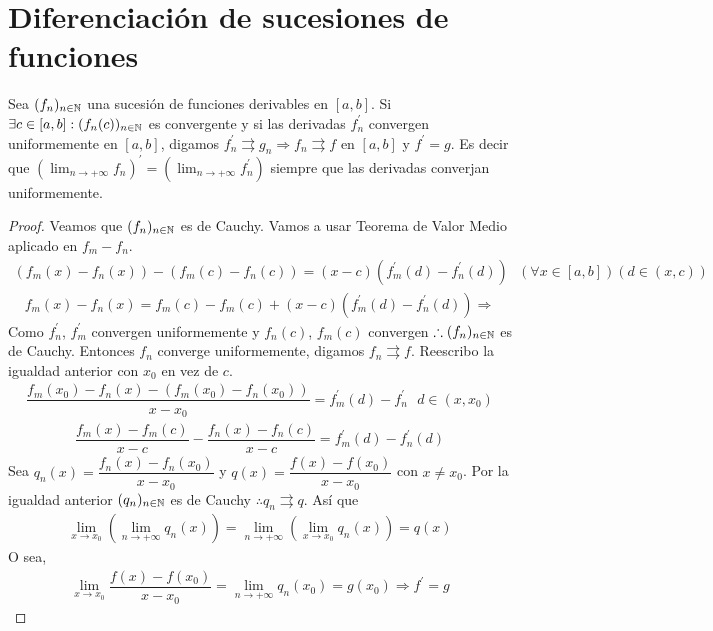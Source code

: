 \section{Diferenciación de sucesiones de funciones}

\begin{theorem}
  Sea $(f_n)_{n \in \mathbb{N}}$ una sucesión de funciones derivables en $[a, b]$. Si $\exists c \in [a, b] : (f_n(c))_{n \in \mathbb{N}}$ es convergente y si las derivadas $f_n^{\prime}$ convergen uniformemente en $[a, b]$, digamos $f_n^{\prime} \rightrightarrows g_n \Rightarrow f_n \rightrightarrows f$ en $[a, b]$ y $f^{\prime} = g$.
  Es decir que $(\lim_{n \to +\infty} f_n)^{\prime} = (\lim_{n \to +\infty} f_n^{\prime})$ siempre que las derivadas converjan uniformemente.
  \begin{proof}
    Veamos que $(f_n)_{n \in \mathbb{N}}$ es de Cauchy. Vamos a usar Teorema de Valor Medio aplicado en $f_m - f_n$. \begin{align*}
      (f_m(x) - f_n(x)) - (f_m(c) - f_n(c)) = (x-c)(f_m^{\prime}(d) - f_n^{\prime}(d)) \text{  } (\forall x \in [a, b])(d \in (x, c))
    \end{align*}
    \begin{align*}
      f_m(x) - f_n(x) = f_m(c) - f_m(c) + (x-c) (f_m^{\prime}(d) - f_n^{\prime}(d)) \Rightarrow
    \end{align*} Como $f_n^{\prime}$, $f_m^{\prime}$ convergen uniformemente y $f_n(c)$, $f_m(c)$ convergen $\therefore (f_n)_{n \in \mathbb{N}}$ es de Cauchy. Entonces $f_n$ converge uniformemente, digamos $f_n \rightrightarrows f$. Reescribo la igualdad anterior con $x_0$ en vez de $c$.
    \begin{align*}
      \dfrac{f_m(x_0) - f_n(x) - (f_m(x_0) - f_n(x_0))}{x - x_0} = f_m^{\prime}(d) - f_n^{\prime} \text{  } d \in (x, x_0)
    \end{align*}
    \begin{align*}
      \dfrac{f_m(x) - f_m(c)}{x - c} - \dfrac{f_n(x) - f_n(c)}{x - c} = f_m^{\prime}(d) - f_n^{\prime}(d)
    \end{align*}
    Sea $q_n(x) = \dfrac{f_n(x)-f_n(x_0)}{x-x_0}$ y $q(x) = \dfrac{f(x)-f(x_0)}{x - x_0}$ con $x \neq x_0$. Por la igualdad anterior $(q_n)_{n \in \mathbb{N}}$ es de Cauchy $\therefore q_n \rightrightarrows q$. Así que \begin{align*}
      \lim_{x \to x_0} (\lim_{n \to +\infty} q_n(x)) = \lim_{n \to +\infty}(\lim_{x \to x_0} q_n(x)) = q(x)
    \end{align*} O sea, \begin{align*}
      \lim_{x \to x_0} \dfrac{f(x) - f(x_0)}{x-x_0} = \lim_{n \to +\infty} q_n(x_0) = g(x_0) \Rightarrow f^{\prime} = g
    \end{align*}
  \end{proof}
\end{theorem}

